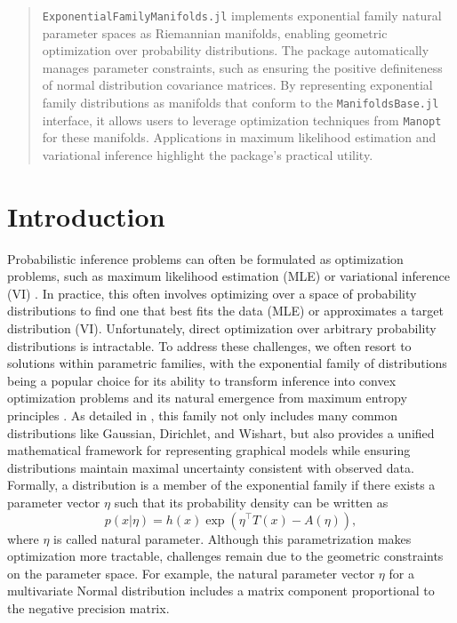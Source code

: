\documentclass{juliacon}
\begin{document}


\maketitle
\begin{abstract}
\texttt{ExponentialFamilyManifolds.jl} implements exponential family natural parameter spaces as Riemannian manifolds, enabling geometric optimization over probability distributions. The package automatically manages parameter constraints, such as ensuring the positive definiteness of normal distribution covariance matrices. By representing exponential family distributions as manifolds that conform to the \texttt{ManifoldsBase.jl} interface, it allows users to leverage optimization techniques from \texttt{Manopt} for these manifolds. Applications in maximum likelihood estimation and variational inference highlight the package's practical utility.
\end{abstract}

\section{Introduction}

Probabilistic inference problems can often be formulated as optimization problems, such as maximum likelihood estimation (MLE) or variational inference (VI) \cite{blei_variational_2017}. In practice, this often involves optimizing over a space of probability distributions to find one that best fits the data (MLE) or approximates a target distribution (VI). Unfortunately, direct optimization over arbitrary probability distributions is intractable. To address these challenges, we often resort to solutions within parametric families, with the exponential family of distributions being a popular choice for its ability to transform inference into convex optimization problems and its natural emergence from maximum entropy principles \cite{wainwright_graphical_2008}. As detailed in \cite[Chapter~3]{wainwright_graphical_2008}, this family not only includes many common distributions like Gaussian, Dirichlet, and Wishart, but also provides a unified mathematical framework for representing graphical models while ensuring distributions maintain maximal uncertainty consistent with observed data. Formally, a distribution is a member of the exponential family if there exists a parameter vector $\eta$ such that its probability density can be written as
\begin{equation*}\label{eq:exponential-family}
p(x|\eta) = h(x)\exp\left(\eta^\top T(x) - A(\eta)\right),
\end{equation*}
where $\eta$ is called natural parameter. Although this parametrization makes optimization more tractable, challenges remain due to the geometric constraints on the parameter space. For example, the natural parameter vector $\eta$ for a multivariate Normal distribution includes a matrix component proportional to the negative precision matrix.
\end{document}
